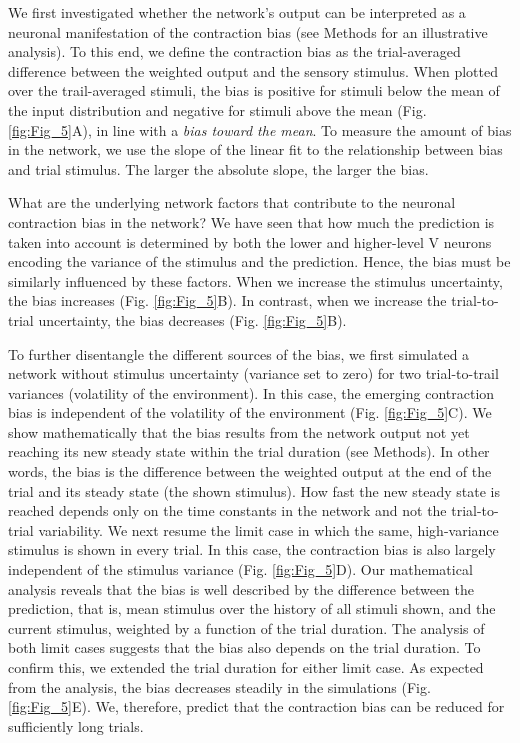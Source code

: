 \documentclass[10pt,a4paper]{article}
\begin{document}
We first investigated whether the network's output can be interpreted as a neuronal manifestation of the contraction bias (see Methods for an illustrative analysis). To this end, we define the contraction bias as the trial-averaged difference between the weighted output and the sensory stimulus. When plotted over the trail-averaged stimuli, the bias is positive for stimuli below the mean of the input distribution and negative for stimuli above the mean (Fig. \ref{fig:Fig_5}A), in line with a \textit{bias toward the mean}. To measure the amount of bias in the network, we use the slope of the linear fit to the relationship between bias and trial stimulus. The larger the absolute slope, the larger the bias. 

What are the underlying network factors that contribute to the neuronal contraction bias in the network? We have seen that how much the prediction is taken into account is determined by both the lower and higher-level V neurons encoding the variance of the stimulus and the prediction. Hence, the bias must be similarly influenced by these factors. When we increase the stimulus uncertainty, the bias increases (Fig. \ref{fig:Fig_5}B). In contrast, when we increase the trial-to-trial uncertainty, the bias decreases (Fig. \ref{fig:Fig_5}B). 

To further disentangle the different sources of the bias, we first simulated a network without stimulus uncertainty (variance set to zero) for two trial-to-trail variances (volatility of the environment). In this case, the emerging contraction bias is independent of the volatility of the environment (Fig. \ref{fig:Fig_5}C). We show mathematically that the bias results from the network output not yet reaching its new steady state within the trial duration (see Methods). In other words, the bias is the difference between the weighted output at the end of the trial and its steady state (the shown stimulus). How fast the new steady state is reached depends only on the time constants in the network and not the trial-to-trial variability. We next resume the limit case in which the same, high-variance stimulus is shown in every trial. In this case, the contraction bias is also largely independent of the stimulus variance (Fig. \ref{fig:Fig_5}D). Our mathematical analysis reveals that the bias is well described by the difference between the prediction, that is, mean stimulus over the history of all stimuli shown, and the current stimulus, weighted by a function of the trial duration. The analysis of both limit cases suggests that the bias also depends on the trial duration. To confirm this, we extended the trial duration for either limit case. As expected from the analysis, the bias decreases steadily in the simulations (Fig. \ref{fig:Fig_5}E). We, therefore, predict that the contraction bias can be reduced for sufficiently long trials. 
\end{document}
